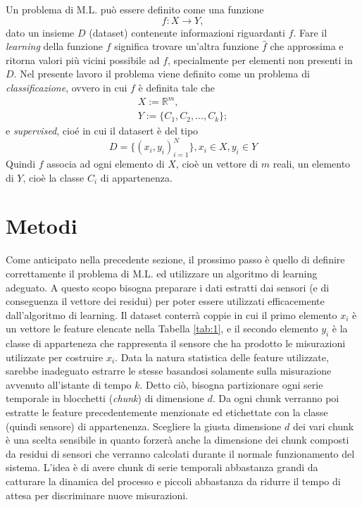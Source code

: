 \documentclass[Lau,binding=0.6cm]{sapthesis}
\begin{document}
Un problema di M.L. pu\`o essere definito come una funzione 
\begin{equation}
f: X \to Y,\label{eq:3}
\end{equation}
dato un insieme $D$ (dataset) contenente informazioni riguardanti $f$.
Fare il \textit{learning} della funzione $f$ significa trovare un'altra funzione $\hat{f}$ che approssima e ritorna valori più vicini possibile ad $f$, specialmente per elementi non presenti in $D$.
Nel presente lavoro il problema viene definito come un problema di \textit{classificazione}, ovvero in cui $f$ \`e definita tale che
\begin{equation}
    \begin{array}{l}
    X := \mathbb{R}^m, \\
    Y := \{ C_1, C_2, \ldots, C_k \};
    \end{array}
\end{equation} 
e \textit{supervised}, cio\'e in cui il datasert \`e del tipo
\begin{equation}
    D = \{ (x_i, y_i)_{i=1}^N \}, x_i\in X, y_i\in Y
\end{equation}
Quindi $f$ associa ad ogni elemento di $X$, cio\`e un vettore di $m$ reali, un elemento di $Y$, cio\`e la classe $C_i$ di appartenenza.


\chapter{Metodi}\label{chap:2}

Come anticipato nella precedente sezione, il prossimo passo \`e quello di definire correttamente il problema di M.L. ed utilizzare un algoritmo di learning adeguato.
A questo scopo bisogna preparare i dati estratti dai sensori (e di conseguenza il vettore dei residui) per poter essere utilizzati efficacemente dall'algoritmo di learning.
Il dataset conterr\`a coppie in cui il primo elemento $x_i$ \`e un vettore le feature elencate nella Tabella \ref{tab:1}, e il secondo elemento $y_i$ \`e la classe di apparteneza che rappresenta il sensore che ha prodotto le misurazioni utilizzate per costruire $x_i$.
Data la natura statistica delle feature utilizzate, sarebbe inadeguato estrarre le stesse basandosi solamente sulla misurazione avvenuto all'istante di tempo $k$.
Detto ci\`o, bisogna partizionare ogni serie temporale in blocchetti (\textit{chunk}) di dimensione $d$. 
Da ogni chunk verranno poi estratte le feature precedentemente menzionate ed etichettate con la classe (quindi sensore) di appartenenza.
Scegliere la giusta dimensione $d$ dei vari chunk \`e una scelta sensibile in quanto forzer\`a anche la dimensione dei chunk composti da residui di sensori che verranno calcolati durante il normale funzionamento del sistema.
L'idea \`e di avere chunk di serie temporali abbastanza grandi da catturare la dinamica del processo e piccoli abbastanza da ridurre il tempo di attesa per discriminare nuove misurazioni.
\end{document}
